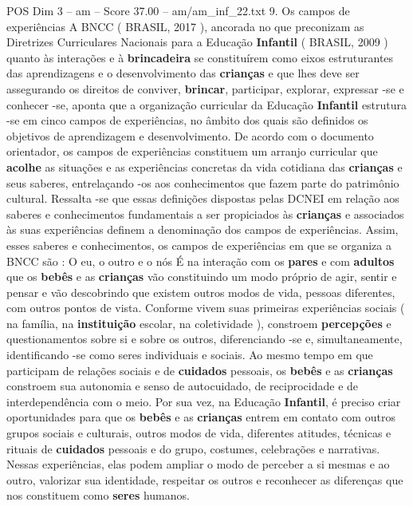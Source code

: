 \begin{textsample}{POS Dim 3 – am – Score 37.00 – am/am\_inf\_22.txt}  \label{ex:f3_pos_032}
9.
Os campos de experiências A BNCC ( BRASIL, 2017 ), ancorada no que preconizam as Diretrizes Curriculares Nacionais para a Educação \textbf{Infantil} ( BRASIL, 2009 ) quanto às interações e à \textbf{brincadeira} se constituírem como eixos estruturantes das aprendizagens e o desenvolvimento das \textbf{crianças} e que lhes deve ser assegurando os direitos de conviver, \textbf{brincar}, participar, explorar, expressar -se e conhecer -se, aponta que a organização curricular da Educação \textbf{Infantil} estrutura -se em cinco campos de experiências, no âmbito dos quais são definidos os objetivos de aprendizagem e desenvolvimento.
De acordo com o documento orientador, os campos de experiências constituem um arranjo curricular que \textbf{acolhe} as situações e as experiências concretas da vida cotidiana das \textbf{crianças} e seus saberes, entrelaçando -os aos conhecimentos que fazem parte do patrimônio cultural.
Ressalta -se que essas definições dispostas pelas DCNEI em relação aos saberes e conhecimentos fundamentais a ser propiciados às \textbf{crianças} e associados às suas experiências definem a denominação dos campos de experiências.
Assim, esses saberes e conhecimentos, os campos de experiências em que se organiza a BNCC são : O eu, o outro e o nós É na interação com os \textbf{pares} e com \textbf{adultos} que os \textbf{bebês} e as \textbf{crianças} vão constituindo um modo próprio de agir, sentir e pensar e vão descobrindo que existem outros modos de vida, pessoas diferentes, com outros pontos de vista.
Conforme vivem suas primeiras experiências sociais ( na família, na \textbf{instituição} escolar, na coletividade ), constroem \textbf{percepções} e questionamentos sobre si e sobre os outros, diferenciando -se e, simultaneamente, identificando -se como seres individuais e sociais.
Ao mesmo tempo em que participam de relações sociais e de \textbf{cuidados} pessoais, os \textbf{bebês} e as \textbf{crianças} constroem sua autonomia e senso de autocuidado, de reciprocidade e de interdependência com o meio.
Por sua vez, na Educação \textbf{Infantil}, é preciso criar oportunidades para que os \textbf{bebês} e as \textbf{crianças} entrem em contato com outros grupos sociais e culturais, outros modos de vida, diferentes atitudes, técnicas e rituais de \textbf{cuidados} pessoais e do grupo, costumes, celebrações e narrativas.
Nessas experiências, elas podem ampliar o modo de perceber a si mesmas e ao outro, valorizar sua identidade, respeitar os outros e reconhecer as diferenças que nos constituem como \textbf{seres} humanos.

\end{textsample}
